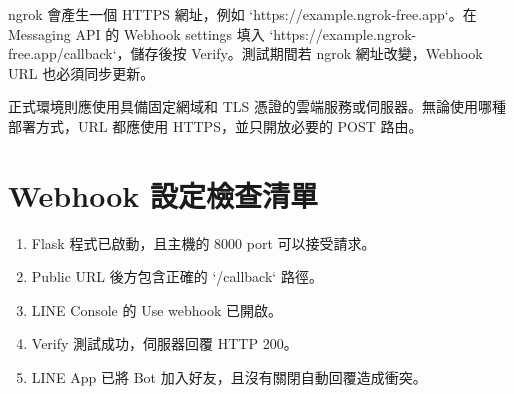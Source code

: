 ngrok 會產生一個 HTTPS 網址，例如 `https://example.ngrok-free.app`。在 Messaging API 的 Webhook settings 填入 `https://example.ngrok-free.app/callback`，儲存後按 Verify。測試期間若 ngrok 網址改變，Webhook URL 也必須同步更新。

正式環境則應使用具備固定網域和 TLS 憑證的雲端服務或伺服器。無論使用哪種部署方式，URL 都應使用 HTTPS，並只開放必要的 POST 路由。

\section{Webhook 設定檢查清單}
\begin{enumerate}[leftmargin=3em]
    \item Flask 程式已啟動，且主機的 8000 port 可以接受請求。
    \item Public URL 後方包含正確的 `/callback` 路徑。
    \item LINE Console 的 Use webhook 已開啟。
    \item Verify 測試成功，伺服器回覆 HTTP 200。
    \item LINE App 已將 Bot 加入好友，且沒有關閉自動回覆造成衝突。
\end{enumerate}
